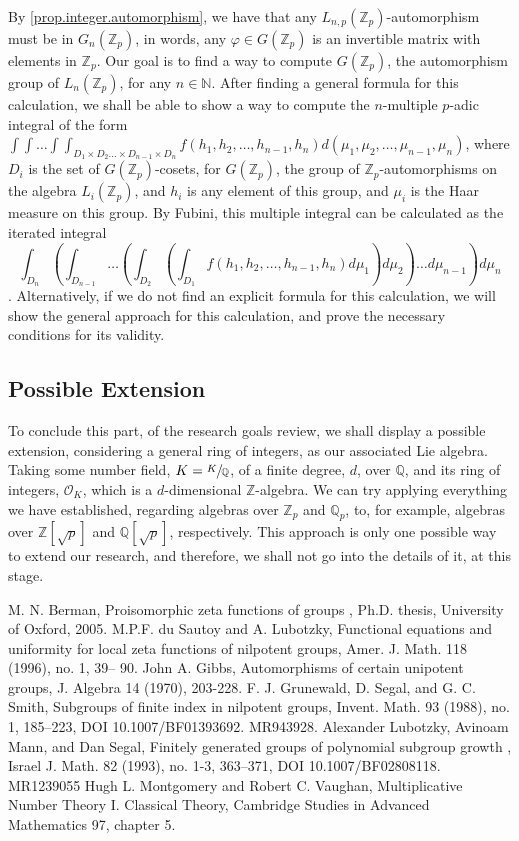 \documentclass[12pt]{article}
\begin{document}
By \ref{prop.integer.automorphism}, we have that any $L_{n,p}(\mathbb{Z}_p)$-automorphism must be in $G_n(\mathbb{Z}_p)$, in words, any $\varphi\in G(\mathbb{Z}_p)$ is an invertible matrix with elements in $\mathbb{Z}_p$. Our goal is to find a way to compute $G(\mathbb{Z}_p)$, the automorphism group of $L_n(\mathbb{Z}_p)$, for any $n\in\mathbb{N}$. After finding a general formula for this calculation, we shall be able to show a way to compute the $n$-multiple $p$-adic integral of the form $\displaystyle\int\int\dots\int\int_{D_1\times D_2\dots\times D_{n-1}\times D_n}f(h_1,h_2,\dots,h_{n-1},h_n)d(\mu_1,\mu_2,\dots,\mu_{n-1},\mu_n)$, where $D_i$ is the set of $G(\mathbb{Z}_p)$-cosets, for $G(\mathbb{Z}_p)$, the group of $\mathbb{Z}_p$-automorphisms on the algebra $L_i(\mathbb{Z}_p)$, and $h_i$ is any element of this group, and $\mu_i$ is the Haar measure on this group. By Fubini, this multiple integral can be calculated as the iterated integral $$\displaystyle\int_{D_n}\left(\int_{D_{n-1}}\dots\left(\int_{D_2}\left(\int_{D_1}f(h_1,h_2,\dots,h_{n-1},h_n)d\mu_1\right)d\mu_2\right)\dots d\mu_{n-1}\right)d\mu_n$$. Alternatively, if we do not find an explicit formula for this calculation, we will show the general approach for this calculation, and prove the necessary conditions for its validity. 
\subsection{Possible Extension}
To conclude this part, of the research goals review, we shall display a possible extension, considering a general ring of integers, as our associated Lie algebra. Taking some number field, $K=\sfrac{K}{\mathbb{Q}}$, of a finite degree, $d$, over $\mathbb{Q}$, and its ring of integers, $\mathcal{O}_K$, which is a $d$-dimensional $\mathbb{Z}$-algebra. We can try applying everything we have established, regarding algebras over $\mathbb{Z}_p$ and $\mathbb{Q}_p$, to, for example, algebras over $\mathbb{Z}[\sqrt{p}]$ and $\mathbb{Q}[\sqrt{p}]$, respectively. This approach is only one possible way to extend our research, and therefore, we shall not go into the details of it, at this stage.
\begin{thebibliography}{2}
 M. N. Berman,
Proisomorphic zeta functions of groups
, Ph.D. thesis, University of Oxford,
2005.
 M.P.F. du Sautoy and A. Lubotzky, Functional equations and uniformity for
local zeta functions of nilpotent groups, Amer. J. Math. 118 (1996), no. 1, 39–
90.
 John A. Gibbs, Automorphisms of certain unipotent groups, J. Algebra 14 (1970), 203-228.
 F. J. Grunewald, D. Segal, and G. C. Smith, Subgroups of finite index in nilpotent groups,
Invent. Math. 93 (1988), no. 1, 185–223, DOI 10.1007/BF01393692. MR943928.
 Alexander Lubotzky, Avinoam Mann, and Dan Segal,
Finitely generated groups of polynomial
subgroup growth
, Israel J. Math.
82
(1993), no. 1-3, 363–371, DOI 10.1007/BF02808118.
MR1239055
 Hugh L. Montgomery and Robert C. Vaughan, Multiplicative Number Theory I. Classical Theory, Cambridge Studies in Advanced Mathematics 97, chapter 5.
\end{thebibliography}
\end{document}
